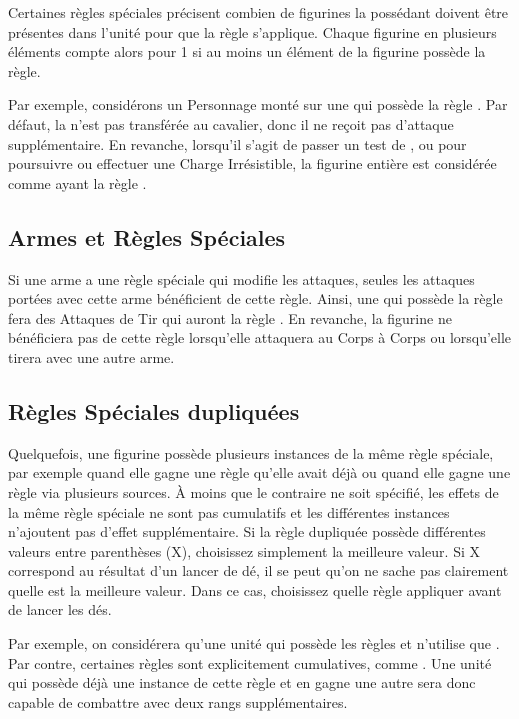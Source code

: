Certaines règles spéciales précisent combien de figurines la possédant doivent être présentes dans l'unité pour que la règle s'applique. Chaque figurine en plusieurs éléments compte alors pour 1 si au moins un élément de la figurine possède la règle.

Par exemple, considérons un Personnage monté sur une \monstrousbeast{} qui possède la règle \frenzy{}. Par défaut, la \frenzy{} n'est pas transférée au cavalier, donc il ne reçoit pas d'attaque supplémentaire. En revanche, lorsqu'il s'agit de passer un test de \frenzy{}, ou pour poursuivre ou effectuer une Charge Irrésistible, la figurine entière est considérée comme ayant la règle \frenzy{}.

\subsection{Armes et Règles Spéciales}

Si une arme a une règle spéciale qui modifie les attaques, seules les attaques portées avec cette arme bénéficient de cette règle. Ainsi, une \handgun{} qui possède la règle \armourpiercing{} fera des Attaques de Tir qui auront la règle \armourpiercing{}. En revanche, la figurine ne bénéficiera pas de cette règle lorsqu'elle attaquera au Corps à Corps ou lorsqu'elle tirera avec une autre arme.

\subsection{Règles Spéciales dupliquées}

Quelquefois, une figurine possède plusieurs instances de la même règle spéciale, par exemple quand elle gagne une règle qu'elle avait déjà ou quand elle gagne une règle via plusieurs sources. À moins que le contraire ne soit spécifié, les effets de la même règle spéciale ne sont pas cumulatifs et les différentes instances n'ajoutent pas d'effet supplémentaire. Si la règle dupliquée possède différentes valeurs entre parenthèses (X), choisissez simplement la meilleure valeur. Si X correspond au résultat d'un lancer de dé, il se peut qu'on ne sache pas clairement quelle est la meilleure valeur. Dans ce cas, choisissez quelle règle appliquer avant de lancer les dés.

Par exemple, on considérera qu'une unité qui possède les règles  et  n'utilise que . Par contre, certaines règles sont explicitement cumulatives, comme \fightinextrarank{}. Une unité qui possède déjà une instance de cette règle et en gagne une autre sera donc capable de combattre avec deux rangs supplémentaires. 
